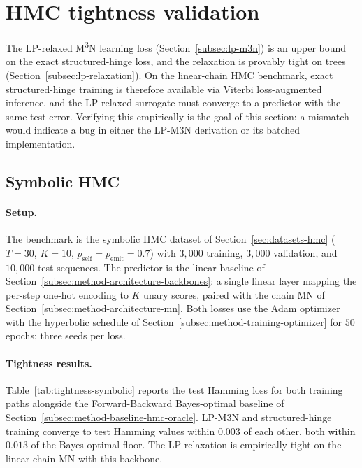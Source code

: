 \section{HMC tightness validation}
\label{sec:experiments-tightness}

The LP-relaxed M\textsuperscript{3}N learning loss
(Section~\ref{subsec:lp-m3n}) is an upper bound on the exact
structured-hinge loss, and the relaxation is provably tight on
trees (Section~\ref{subsec:lp-relaxation}). On the linear-chain
HMC benchmark, exact structured-hinge training is therefore
available via Viterbi loss-augmented inference, and the
LP-relaxed surrogate must converge to a predictor with the same
test error. Verifying this empirically is the goal of this
section: a mismatch would indicate a bug in either the LP-M3N
derivation or its batched implementation.

\subsection{Symbolic HMC}
\label{subsec:experiments-tightness-symbolic}

\paragraph{Setup.}
The benchmark is the symbolic HMC dataset of
Section~\ref{sec:datasets-hmc} ($T = 30$, $K = 10$,
$p_{\mathrm{self}} = p_{\mathrm{emit}} = 0.7$) with $3{,}000$
training, $3{,}000$ validation, and $10{,}000$ test sequences.
The predictor is the linear baseline of
Section~\ref{subsec:method-architecture-backbones}: a single
linear layer mapping the per-step one-hot encoding to $K$ unary
scores, paired with the chain MN of
Section~\ref{subsec:method-architecture-mn}. Both losses use
the Adam optimizer with the hyperbolic schedule of
Section~\ref{subsec:method-training-optimizer} for $50$ epochs;
three seeds per loss.

\paragraph{Tightness results.}
Table~\ref{tab:tightness-symbolic} reports the test Hamming
loss for both training paths alongside the Forward-Backward
Bayes-optimal baseline of
Section~\ref{subsec:method-baseline-hmc-oracle}. LP-M3N and
structured-hinge training converge to test Hamming values
within $0.003$ of each other, both within $0.013$ of the
Bayes-optimal floor. The LP relaxation is empirically tight on
the linear-chain MN with this backbone.

